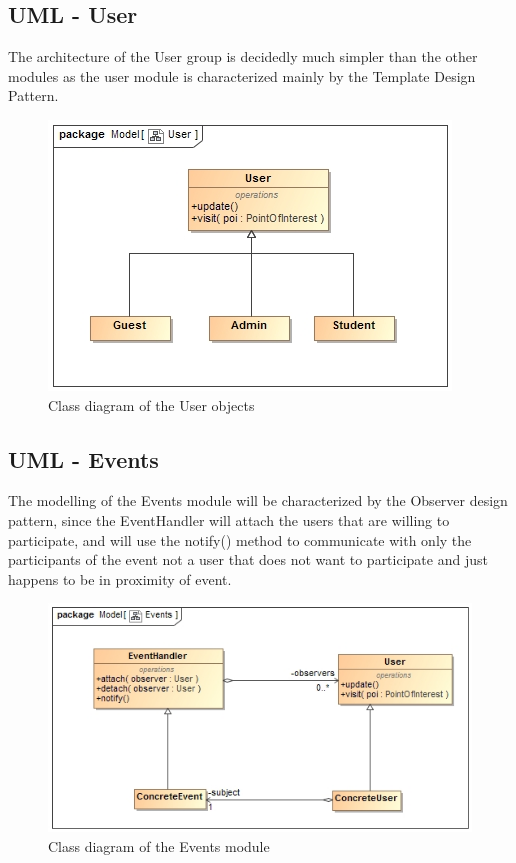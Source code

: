 \documentclass[12pt,a4paper]{article}
\begin{document}
	\subsection{UML - User}
	The architecture of the User group is decidedly much simpler than the other modules as the user module is characterized mainly by the Template Design Pattern.
	\begin{figure}
		\includegraphics[width=\linewidth]{Images/User.jpg}
		\caption{Class diagram of the User objects}
	\end{figure}
	
	\subsection{UML - Events}
	The modelling of the Events module will be characterized by the Observer design pattern, since the EventHandler will attach the users that are willing to participate, and will use the notify() method to communicate with only the participants of the event not a user that does not want to participate and just happens to be in proximity of event.
	\begin{figure}
		\includegraphics[width=\linewidth]{Images/Events.jpg}
		\caption{Class diagram of the Events module}
	\end{figure}
	
\end{document}
